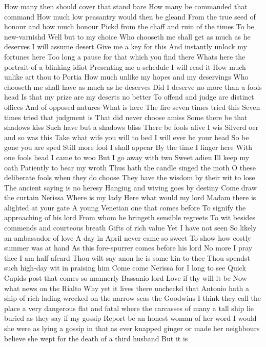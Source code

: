 How many then should cover that stand bare
How many be commanded that command
How much low peasantry would then be gleand
From the true seed of honour and how much honour
Pickd from the chaff and ruin of the times
To be new-varnishd Well but to my choice
Who chooseth me shall get as much as he deserves
I will assume desert Give me a key for this
And instantly unlock my fortunes here
Too long a pause for that which you find there
Whats here the portrait of a blinking idiot
Presenting me a schedule I will read it
How much unlike art thou to Portia
How much unlike my hopes and my deservings
Who chooseth me shall have as much as he deserves
Did I deserve no more than a fools head
Is that my prize are my deserts no better
To offend and judge are distinct offices
And of opposed natures
What is here
The fire seven times tried this
Seven times tried that judgment is
That did never choose amiss
Some there be that shadows kiss
Such have but a shadows bliss
There be fools alive I wis
Silverd oer and so was this
Take what wife you will to bed
I will ever be your head
So be gone you are sped
Still more fool I shall appear
By the time I linger here
With one fools head I came to woo
But I go away with two
Sweet adieu Ill keep my oath
Patiently to bear my wroth
Thus hath the candle singed the moth
O these deliberate fools when they do choose
They have the wisdom by their wit to lose
The ancient saying is no heresy
Hanging and wiving goes by destiny
Come draw the curtain Nerissa
Where is my lady
Here what would my lord
Madam there is alighted at your gate
A young Venetian one that comes before
To signify the approaching of his lord
From whom he bringeth sensible regreets
To wit besides commends and courteous breath
Gifts of rich value Yet I have not seen
So likely an ambassador of love
A day in April never came so sweet
To show how costly summer was at hand
As this fore-spurrer comes before his lord
No more I pray thee I am half afeard
Thou wilt say anon he is some kin to thee
Thou spendst such high-day wit in praising him
Come come Nerissa for I long to see
Quick Cupids post that comes so mannerly
Bassanio lord Love if thy will it be
Now what news on the Rialto
Why yet it lives there uncheckd that Antonio hath
a ship of rich lading wrecked on the narrow seas
the Goodwins I think they call the place a very
dangerous flat and fatal where the carcasses of many
a tall ship lie buried as they say if my gossip
Report be an honest woman of her word
I would she were as lying a gossip in that as ever
knapped ginger or made her neighbours believe she
wept for the death of a third husband But it is
